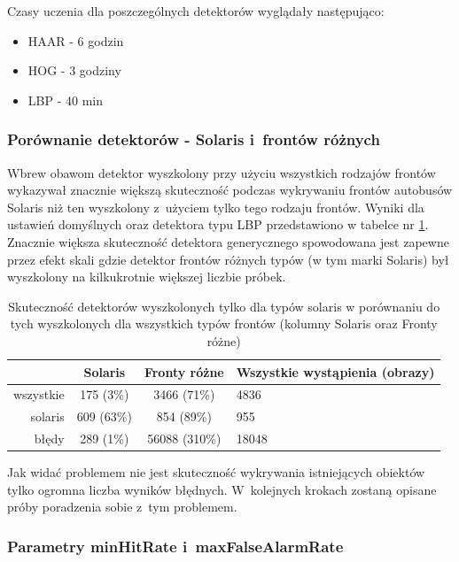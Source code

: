 Czasy uczenia dla poszczególnych detektorów wyglądały następująco:
\begin{itemize}
    \item HAAR - 6 godzin
    \item HOG - 3 godziny
    \item LBP - 40 min
\end{itemize}

\subsubsection{Porównanie detektorów - Solaris i~frontów różnych}

Wbrew obawom detektor wyszkolony przy użyciu wszystkich 
rodzajów frontów 
wykazywał znacznie większą skuteczność podczas wykrywaniu 
frontów autobusów Solaris niż ten
wyszkolony z~użyciem tylko tego rodzaju frontów. Wyniki dla ustawień
domyślnych oraz detektora typu LBP przedstawiono w tabelce nr 
\ref{tab:sol_vs_all}. Znacznie większa skuteczność detektora
generycznego spowodowana jest zapewne przez efekt skali
gdzie detektor frontów różnych typów (w tym marki Solaris) 
był wyszkolony na kilkukrotnie większej liczbie próbek.

\begin{table}[!h]
    \centering
    \begin{tabular}{r|c|c|l}
          & Solaris    & Fronty różne   & Wszystkie wystąpienia (obrazy) \\
          \hline
wszystkie & 175 (3\%)  & 3466 (71\%)    & 4836      \\
solaris   & 609 (63\%) & 854 (89\%)     & 955       \\
błędy     & 289 (1\%)  & 56088 (310\%)  & 18048     \\
    \end{tabular}
    \caption{Skuteczność detektorów wyszkolonych tylko dla typów
    solaris w porównaniu do tych wyszkolonych dla wszystkich typów frontów
    (kolumny Solaris oraz Fronty różne)}
    \label{tab:sol_vs_all}
\end{table}

Jak widać problemem nie jest skuteczność wykrywania istniejących obiektów
tylko ogromna liczba wyników błędnych. W~kolejnych krokach zostaną opisane
próby poradzenia sobie z~tym problemem.

\subsubsection{Parametry minHitRate i~maxFalseAlarmRate}

